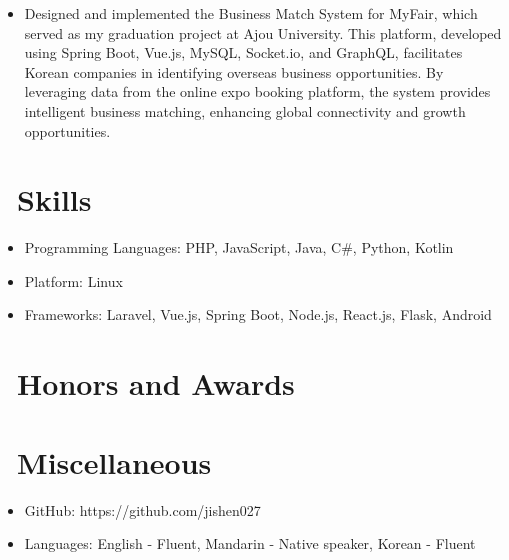 \documentclass{resume}
\begin{document}
\begin{itemize}
  \item Designed and implemented the Business Match System for MyFair, which served as my graduation project at Ajou University. This platform, developed using Spring Boot, Vue.js, MySQL, Socket.io, and GraphQL, facilitates Korean companies in identifying overseas business opportunities. By leveraging data from the online expo booking platform, the system provides intelligent business matching, enhancing global connectivity and growth opportunities.
\end{itemize}

\section{\faCogs\ Skills}
\begin{itemize}[parsep=0.5ex]
  \item Programming Languages: PHP, JavaScript, Java, C\#, Python, Kotlin
  \item Platform: Linux
  \item Frameworks: Laravel, Vue.js, Spring Boot, Node.js, React.js, Flask, Android
\end{itemize}

\section{\faHeartO\ Honors and Awards}

\section{\faInfo\ Miscellaneous}
\begin{itemize}[parsep=0.5ex]
  \item GitHub: https://github.com/jishen027
  \item Languages: English - Fluent, Mandarin - Native speaker, Korean - Fluent
\end{itemize}

%
%
\end{document}
